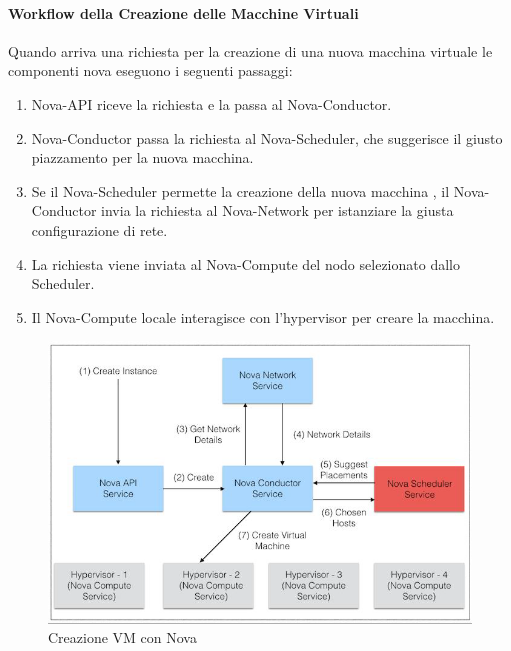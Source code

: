 \documentclass{article}
\begin{document}
\paragraph{Workflow della Creazione delle Macchine Virtuali}
Quando arriva una richiesta per la creazione di una nuova macchina virtuale le componenti nova eseguono i seguenti passaggi:
\begin{enumerate}
    \item Nova-API riceve la richiesta e la passa al Nova-Conductor.
    \item Nova-Conductor passa la richiesta al Nova-Scheduler, che suggerisce il giusto piazzamento per la nuova macchina.
    \item Se il Nova-Scheduler permette la creazione della nuova macchina , il Nova-Conductor invia la richiesta al Nova-Network per istanziare la giusta configurazione di rete.
    \item La richiesta viene inviata al Nova-Compute del nodo selezionato dallo Scheduler.
    \item Il Nova-Compute locale interagisce con l'hypervisor per creare la macchina.
\end{enumerate}
\begin{figure}[H]
    \centering
    \includegraphics[scale=0.5]{img/vm_nova_creation.png}
    \caption{Creazione VM con Nova}
\end{figure}\noindent
\end{document}
